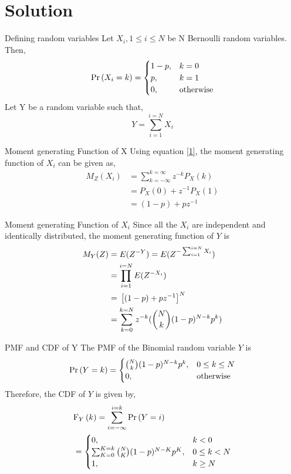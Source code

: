 \documentclass{beamer}
\begin{document}
\section{Solution}
\begin{frame}{Defining random variables}
Let $X_{i}, 1 \leq i \leq N$ be N Bernoulli random variables.  Then,
\begin{align}   
\Pr\left(X_i = k\right) = 
\begin{cases}
1 - p, & k = 0 \\
p, & k = 1 \\
0, & \textrm{otherwise}
\end{cases}
\label{1}
\end{align}
Let Y be a random variable such that,
\begin{equation}
    Y = \sum_{i = 1}^{i = N}X_i 
\end{equation}
\end{frame}
\begin{frame}{Moment generating Function of X}
    Using equation \eqref{1}, the moment generating function of $X_{i}$ can be given as,
\begin{align}
    M_Z(X_i) &= \sum_{k = -\infty}^{k = \infty}z^{-k}P_X(k) \\
             &= P_X(0) + z^{-1}P_X(1) \\
             &= (1 - p) + pz^{-1}
\end{align}
\end{frame}
\begin{frame}{Moment generating Function of $X_i$}
   Since all the $X_i$ are independent and identically distributed, the moment generating function of $Y$ is
\begin{align}
M_Y(Z) &= E(Z^{-Y}) = E(Z^{-\sum_{i = 1}^{i = N}X_i}) \\
       &= \prod_{i = 1}^{i = N}E(Z^{-X_i}) \\
       &= {}\left[(1 - p) + pz^{-1}\right]^N \\
       &= \sum_{k = 0}^{k = N}z^{-k}(\binom{N}{k}(1 - p)^{N - k}p^k)
\end{align} 
\end{frame}

\begin{frame}{PMF and CDF of Y}
    The PMF of the Binomial random variable $Y$ is
\begin{align}
\Pr\left(Y = k\right) = 
\begin{cases}
\binom{N}{k}(1 - p)^{N - k}p^k, & 0 \leq k \leq N \\
0, & \textrm{otherwise}
\end{cases}
\label{pmf-Y}
\end{align}
Therefore, the CDF of $Y$ is given by,
\begin{align}
&\text{F}_{Y}\left(k\right) = \sum_{i = -\infty}^{i = k}\Pr\left(Y = i\right) \nonumber\\
&=\begin{cases}
0, & k < 0 \\
\sum_{K = 0}^{K = k}\binom{N}{K}(1 - p)^{N - K}p^K, & 0 \leq k < N \\
1, & k \geq N
\end{cases}
\label{cdf-Y}
\end{align}
\end{frame}
\end{document}
